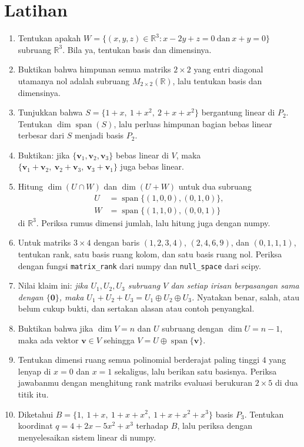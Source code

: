 \section{Latihan}

\begin{latihan}
\begin{enumerate}
  \item Tentukan apakah $W=\{(x,y,z)\in\mathbb{R}^{3}:x-2y+z=0\ \text{dan}\ x+y=0\}$
        subruang $\mathbb{R}^{3}$. Bila ya, tentukan basis dan dimensinya.
  \item Buktikan bahwa himpunan semua matriks $2\times2$ yang entri diagonal utamanya nol
        adalah subruang $M_{2\times2}(\mathbb{R})$, lalu tentukan basis dan dimensinya.
  \item Tunjukkan bahwa $S=\{1+x,\ 1+x^{2},\ 2+x+x^{2}\}$ bergantung linear di $P_{2}$.
        Tentukan $\dim\operatorname{span}(S)$, lalu perluas himpunan bagian bebas linear
        terbesar dari $S$ menjadi basis $P_{2}$.
  \item Buktikan: jika $\{\mathbf{v}_{1},\mathbf{v}_{2},\mathbf{v}_{3}\}$ bebas linear di
        $V$, maka $\{\mathbf{v}_{1}+\mathbf{v}_{2},\ \mathbf{v}_{2}+\mathbf{v}_{3},\
        \mathbf{v}_{3}+\mathbf{v}_{1}\}$ juga bebas linear.
  \item Hitung $\dim(U\cap W)$ dan $\dim(U+W)$ untuk dua subruang
        \begin{align*}
          U &= \operatorname{span}\{(1,0,0),(0,1,0)\}, \\
          W &= \operatorname{span}\{(1,1,0),(0,0,1)\}
        \end{align*}
        di $\mathbb{R}^{3}$. Periksa rumus dimensi jumlah, lalu hitung juga dengan numpy.
  \item Untuk matriks $3\times4$ dengan baris $(1,2,3,4)$, $(2,4,6,9)$, dan $(0,1,1,1)$,
        tentukan rank, satu basis ruang kolom, dan satu basis ruang nol.
        Periksa dengan fungsi \texttt{matrix\_rank} dari numpy dan
        \texttt{null\_space} dari scipy.
  \item Nilai klaim ini: \emph{jika $U_{1},U_{2},U_{3}$ subruang $V$ dan setiap irisan
        berpasangan sama dengan $\{\mathbf{0}\}$, maka
        $U_{1}+U_{2}+U_{3}=U_{1}\oplus U_{2}\oplus U_{3}$.} Nyatakan benar, salah, atau
        belum cukup bukti, dan sertakan alasan atau contoh penyangkal.
  \item Buktikan bahwa jika $\dim V=n$ dan $U$ subruang dengan $\dim U=n-1$, maka ada
        vektor $\mathbf{v}\in V$ sehingga $V=U\oplus\operatorname{span}\{\mathbf{v}\}$.
  \item Tentukan dimensi ruang semua polinomial berderajat paling tinggi $4$ yang lenyap di
        $x=0$ dan $x=1$ sekaligus, lalu berikan satu basisnya. Periksa jawabanmu dengan
        menghitung rank matriks evaluasi berukuran $2\times5$ di dua titik itu.
  \item Diketahui $B=\{1,\ 1+x,\ 1+x+x^{2},\ 1+x+x^{2}+x^{3}\}$ basis $P_{3}$. Tentukan
        koordinat $q=4+2x-5x^{2}+x^{3}$ terhadap $B$, lalu periksa dengan menyelesaikan
        sistem linear di numpy.
\end{enumerate}


\end{latihan}

